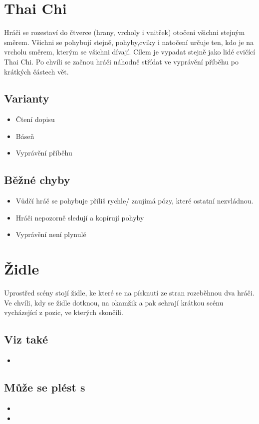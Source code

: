  
 
 
 
\needspace{5cm} \section{Thai Chi} \label{thai chi} Hráči se rozestaví do čtverce (hrany, vrcholy i vnitřek) otočeni všichni stejným směrem. 
Všichni se pohybují stejně, pohyby,cviky i natočení určuje ten, kdo je na vrcholu směrem, kterým se všichni dívají. 
Cílem je vypadat stejně jako lidé cvičící Thai Chi. 
Po chvíli se začnou hráči náhodně střídat ve vyprávění příběhu po krátkých částech vět. 
\subsection{Varianty} \begin{itemize}
\item Čtení dopisu
\item Báseň
\item Vyprávění příběhu
\end{itemize}
\subsection{Běžné chyby} \begin{itemize}
\item Vůdčí hráč se pohybuje příliš rychle/ zaujímá pózy, které ostatní nezvládnou.
\item Hráči nepozorně sledují a kopírují pohyby
\item Vyprávění není plynulé
\end{itemize}
  
\needspace{5cm} \section{Židle} \label{židle} Uprostřed scény stojí židle, ke které se na písknutí ze stran rozeběhnou dva hráči. Ve chvíli, kdy se židle dotknou, na okamžik  a pak sehrají krátkou scénu vycházející z pozic, ve kterých skončili. 
 
\subsection{ Viz také } \begin{itemize}
\item  {}
\end{itemize}
 
\subsection{ Může se plést s } \begin{itemize}
\item  {}
\item  {}
\end{itemize}
 
 
